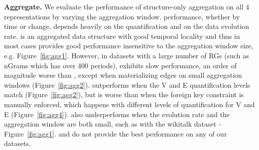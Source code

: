 {\bf Aggregate.}  We evaluate the performance of structure-only
aggregation on all 4 representations by varying the aggregation
window.   performance, whether by time or change,
depends heavily on the quantification and on the data evolution rate.
\og is an aggregated data structure with good temporal locality and
thus in most cases provides good performance insensitive to the
aggregation window size, e.g. Figure~\ref{fig:agg1}.  However, in
datasets with a large number of RGs (such as nGrams which has over 400
periods), \og exhibits slow performance, an order of magnitude worse
than \ve, except when materializing edges on small aggregation windows
(Figure~\ref{fig:agg2}).  \ve outperforms \og when the V and E
quantification levels match (Figure~\ref{fig:agg2}), but is worse than
\og when the foreign key constraint is manually enforced, which
happens with different levels of quantification for V and E
(Figure~\ref{fig:agg4}).  \ve also underperforms \og
when the evolution rate and the aggregation window are both small,
such as with the wikitalk dataset - Figure~\ref{fig:agg1}.  \sg and
\hg do not provide the best performance on any of our datasets.

